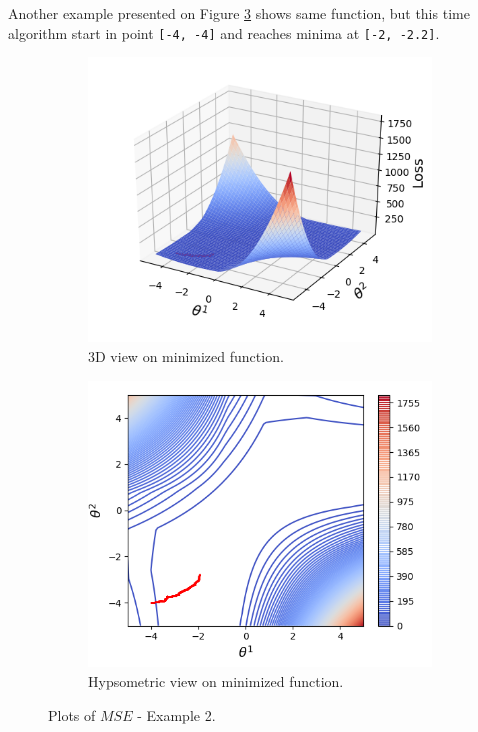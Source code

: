 \documentclass[11pt,a4paper]{IEEEtran}
\begin{document}
Another example presented on Figure \ref{fig:ex2} shows same function, but this time algorithm start in point \texttt{[-4, -4]} and reaches minima at \texttt{[-2, -2.2]}.

\begin{figure}[!hbt]
\centering
	\begin{subfigure}[b]{0.47\textwidth}
		\includegraphics[width=\textwidth]{examples/2/3d.png}
		\caption{3D view on minimized function.}
		\label{fig:ex2:3d-view}
	\end{subfigure}
	\begin{subfigure}[b]{0.47\textwidth}
		\includegraphics[width=\textwidth]{examples/2/2d.png}
		\caption{Hypsometric view on minimized function.}
		\label{fig:ex2:hypsometric}
	\end{subfigure}
	\caption{Plots of $MSE$ - Example 2.}
	\label{fig:ex2}
\end{figure}
\end{document}
